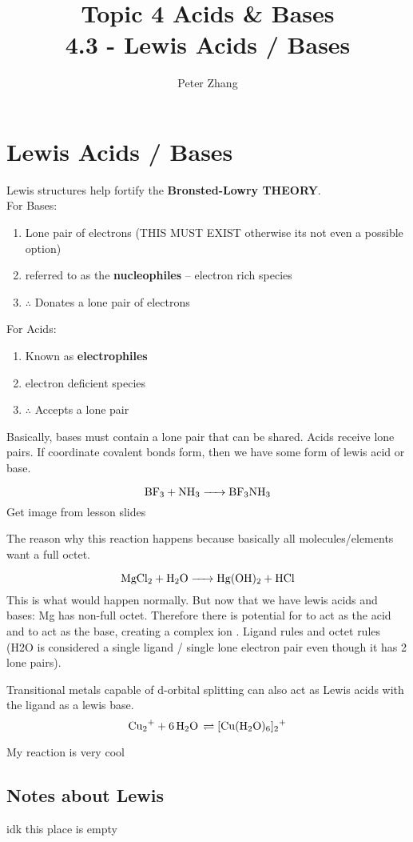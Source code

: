 \documentclass{article}
\title{Topic 4 Acids \& Bases\\4.3 - Lewis Acids / Bases}
\author{Peter Zhang}
\begin{document}
\maketitle
\tableofcontents
\newpage

\section{Lewis Acids / Bases}
Lewis structures help fortify the \textbf{Bronsted-Lowry THEORY}. \\For Bases:
\begin{enumerate}
\item Lone pair of electrons (THIS MUST EXIST otherwise its not even a possible option)
\item referred to as the \textbf{nucleophiles} -- electron rich species
\item $\therefore $ Donates a lone pair of electrons
\end{enumerate}
For Acids:
\begin{enumerate}
\item Known as \textbf{electrophiles}
\item electron deficient species
\item $\therefore $ Accepts a lone pair
\end{enumerate}
Basically, bases must contain a lone pair that can be shared. Acids receive lone pairs. If coordinate covalent bonds form, then we have some form of lewis acid or base. 

$$\ce{BF3 + NH3 -> BF3NH3}$$
Get image from lesson slides

The reason why this reaction happens because basically all molecules/elements want a full octet.

$$\ce{MgCl2 + H2O -> Hg(OH)2 + HCl}$$
This is what would happen normally. But now that we have lewis acids and bases: Mg has non-full octet. Therefore there is potential for  to act as the acid and  to act as the base, creating a complex ion . Ligand rules and octet rules (H2O is considered a single ligand / single lone electron pair even though it has 2 lone pairs).




Transitional metals capable of d-orbital splitting can also act as Lewis acids with the ligand as a lewis base. 
$$\ce{Cu2+ + 6H2O \rightleftharpoons [Cu(H2O)6]2+}$$

My reaction is very cool



\subsection{Notes about Lewis}
idk this place is empty
\end{document}
